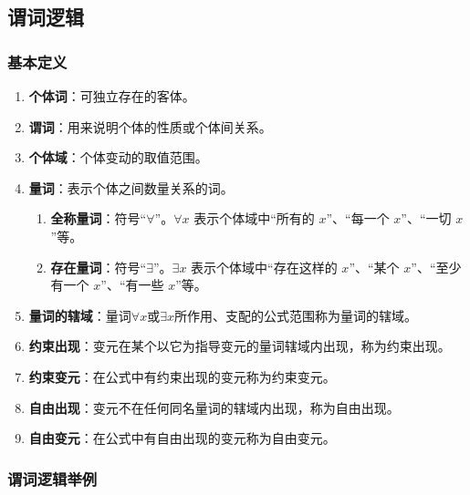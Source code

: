 \subsection{谓词逻辑}

\subsubsection{基本定义}

\begin{enumerate}

\item \textbf{个体词}：可独立存在的客体。
\item \textbf{谓词}：用来说明个体的性质或个体间关系。
\item \textbf{个体域}：个体变动的取值范围。
\item \textbf{量词}：表示个体之间数量关系的词。
\begin{enumerate}
	\item \textbf{全称量词}：符号“\(\forall\)”。\(\forall x\) 表示个体域中“所有的 \(x\)”、“每一个 \(x\)”、“一切 \(x\)”等。
	
	\item \textbf{存在量词}：符号“\(\exists\)”。\(\exists x\) 表示个体域中“存在这样的 \(x\)”、“某个 \(x\)”、“至少有一个 \(x\)”、“有一些 \(x\)”等。
\end{enumerate}

\item \textbf{量词的辖域}：量词$\forall x$或$\exists x$所作用、支配的公式范围称为量词的辖域。

\item \textbf{约束出现}：变元在某个以它为指导变元的量词辖域内出现，称为约束出现。
\item \textbf{约束变元}：在公式中有约束出现的变元称为约束变元。
\item \textbf{自由出现}：变元不在任何同名量词的辖域内出现，称为自由出现。
\item \textbf{自由变元}：在公式中有自由出现的变元称为自由变元。


\end{enumerate}


\subsubsection{谓词逻辑举例}

